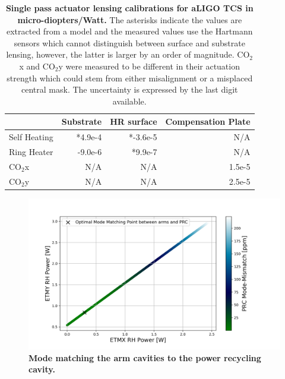 	\begin{table}[]
		\centering
		\begin{tabular}{|l||r|r|r|}
			\hline
			\hline
			& \multicolumn{1}{c|}{Substrate} & \multicolumn{1}{c|}{HR surface} & \multicolumn{1}{c|}{Compensation Plate} \\ \hline
			Self Heating & *4.9e-4                       & *-3.6e-5                        & N/A                                     \\ \hline
			Ring Heater  & -9.0e-6                       & *9.9e-7                         & N/A                                     \\ \hline
			CO$_2$x         & N/A                            & N/A                             & 1.5e-5                                  \\ \hline
			CO$_2$y         & N/A                            & N/A                             & 2.5e-5                                  \\ \hline
		\end{tabular}
		\caption[Single pass actuator lensing calibrations for aLIGO TCS in micro-diopters/Watt.] 
		{\textbf{Single pass actuator lensing calibrations for aLIGO TCS in micro-diopters/Watt.} The asterisks indicate the values are extracted from a model and the measured values use the Hartmann sensors which cannot distinguish between surface and substrate lensing, however, the latter is larger by an order of magnitude.  CO$_2$x and CO$_2$y were measured to be different in their actuation strength which could stem from either misalignment or a misplaced central mask.  The uncertainty is expressed by the last digit available.
		}
		\label{tbl:Actuaor_calibs}
	\end{table}
	
	\begin{figure}[!]
		\centering
		\includegraphics[width=1.0 \textwidth]{../Figures/ETM_TCS_Settings.png}
		\caption[Mode matching the arm cavities to the power recycling cavity.]{
			\textbf{Mode matching the arm cavities to the power recycling cavity.}
		}
		\label{fig:TCS_ETM}
	\end{figure}
\clearpage
